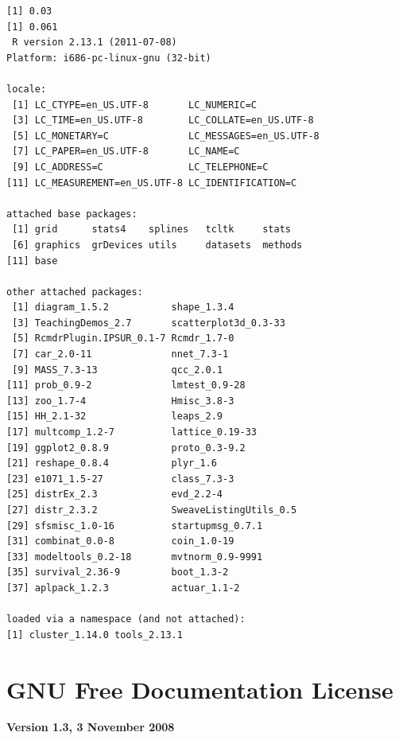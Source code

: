 \documentclass[captions=tableheading]{scrbook}
\begin{document}
\begin{verbatim}
[1] 0.03
[1] 0.061
 R version 2.13.1 (2011-07-08)
Platform: i686-pc-linux-gnu (32-bit)

locale:
 [1] LC_CTYPE=en_US.UTF-8       LC_NUMERIC=C              
 [3] LC_TIME=en_US.UTF-8        LC_COLLATE=en_US.UTF-8    
 [5] LC_MONETARY=C              LC_MESSAGES=en_US.UTF-8   
 [7] LC_PAPER=en_US.UTF-8       LC_NAME=C                 
 [9] LC_ADDRESS=C               LC_TELEPHONE=C            
[11] LC_MEASUREMENT=en_US.UTF-8 LC_IDENTIFICATION=C       

attached base packages:
 [1] grid      stats4    splines   tcltk     stats    
 [6] graphics  grDevices utils     datasets  methods  
[11] base     

other attached packages:
 [1] diagram_1.5.2           shape_1.3.4            
 [3] TeachingDemos_2.7       scatterplot3d_0.3-33   
 [5] RcmdrPlugin.IPSUR_0.1-7 Rcmdr_1.7-0            
 [7] car_2.0-11              nnet_7.3-1             
 [9] MASS_7.3-13             qcc_2.0.1              
[11] prob_0.9-2              lmtest_0.9-28          
[13] zoo_1.7-4               Hmisc_3.8-3            
[15] HH_2.1-32               leaps_2.9              
[17] multcomp_1.2-7          lattice_0.19-33        
[19] ggplot2_0.8.9           proto_0.3-9.2          
[21] reshape_0.8.4           plyr_1.6               
[23] e1071_1.5-27            class_7.3-3            
[25] distrEx_2.3             evd_2.2-4              
[27] distr_2.3.2             SweaveListingUtils_0.5 
[29] sfsmisc_1.0-16          startupmsg_0.7.1       
[31] combinat_0.0-8          coin_1.0-19            
[33] modeltools_0.2-18       mvtnorm_0.9-9991       
[35] survival_2.36-9         boot_1.3-2             
[37] aplpack_1.2.3           actuar_1.1-2           

loaded via a namespace (and not attached):
[1] cluster_1.14.0 tools_2.13.1
\end{verbatim}

\vfill{}
\chapter{GNU Free Documentation License}
\label{sec-18}

\label{cha:GNU-Free-Documentation}

\begin{center}
\textbf{\large Version 1.3, 3 November 2008}\bigskip{}

\par\end{center}
\end{document}
